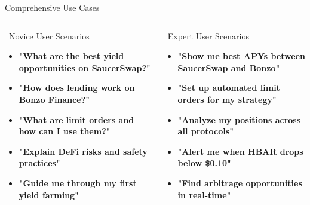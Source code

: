 \documentclass[aspectratio=169]{beamer}
\providecommand{\faShield}{\faLock}
\begin{document}
\begin{frame}{Comprehensive Use Cases}
\vspace{0.05cm}
\begin{columns}
\begin{block}{\faUserGraduate\ Novice User Scenarios}
\begin{itemize}
\setlength\itemsep{-0.1em}
\item[\color{accent}\faQuestion] \textbf{"What are the best yield opportunities on SaucerSwap?"}
\item[\color{accent}\faGraduationCap] \textbf{"How does lending work on Bonzo Finance?"}
\item[\color{accent}\faLightbulb] \textbf{"What are limit orders and how can I use them?"}
\item[\color{accent}\faShield] \textbf{"Explain DeFi risks and safety practices"}
\item[\color{accent}\faChartLine] \textbf{"Guide me through my first yield farming"}
\end{itemize}
\end{block}

\begin{block}{\faUserTie\ Expert User Scenarios}
\begin{itemize}
\setlength\itemsep{-0.1em}
\item[\color{secondary}\faChartBar] \textbf{"Show me best APYs between SaucerSwap and Bonzo"}
\item[\color{secondary}\faRobot] \textbf{"Set up automated limit orders for my strategy"}
\item[\color{secondary}\faChartPie] \textbf{"Analyze my positions across all protocols"}
\item[\color{secondary}\faBell] \textbf{"Alert me when HBAR drops below \$0.10"}
\item[\color{secondary}\faCoins] \textbf{"Find arbitrage opportunities in real-time"}
\end{itemize}
\end{block}
\end{columns}

\vspace{0.1cm}
\begin{center}
\end{center}
\end{frame}
\end{document}
